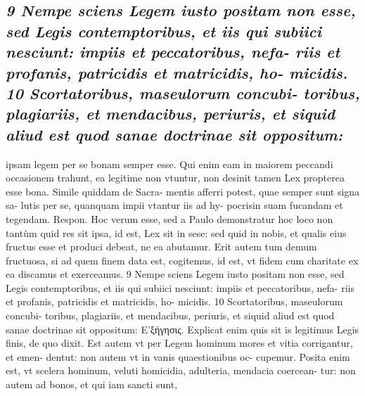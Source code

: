 \documentclass{article}
\begin{document}
\begin{pages}
\subsection*{\textit{9 Nempe sciens Legem iusto positam non esse, sed Legis contemptoribus, et iis qui subiici nesciunt: impiis et peccatoribus, nefa- riis et profanis, patricidis et matricidis, ho- micidis. 10 Scortatoribus, maseulorum concubi- toribus, plagiariis, et mendacibus, periuris, et siquid aliud est quod sanae doctrinae sit oppositum:}}ipsam legem per se bonam semper esse. Qui enim eam in maiorem peccandi occasionem trahunt, ea legitime non vtuntur, non desinit tamen Lex propterea esse bona. Simile quiddam de Sacra- mentis afferri potest, quae semper sunt signa sa- lutis per se, quanquam impii vtantur iis ad hy- pocrisin suam fucandam et tegendam. Respon. Hoc verum esse, sed a Paulo demonstratur hoc loco non tantùm quid res sit ipsa, id est, Lex sit in sese: sed quid in nobis, et qualis eius fructus esse et produci debeat, ne ea abutamur. Erit autem tum demum fructuosa, si ad quem finem data est, cogitemus, id est, vt fidem cum charitate ex ea discamus et exerceamus. 9 Nempe sciens Legem iusto positam non esse, sed Legis contemptoribus, et iis qui subiici nesciunt: impiis et peccatoribus, nefa- riis et profanis, patricidis et matricidis, ho- micidis. 10 Scortatoribus, maseulorum concubi- toribus, plagiariis, et mendacibus, periuris, et siquid aliud est quod sanae doctrinae sit oppositum: E’ξήγησις. Explicat enim quis sit is legitimus Legis finis, de quo dixit. Est autem vt per Legem hominum mores et vitia corrigantur, et emen- dentut: non autem vt in vanis quaestionibus oc- cupemur. Posita enim est, vt scelera hominum, veluti homicidia, adulteria, mendacia coercean- tur: non autem ad bonos, et qui iam sancti sunt,  \pend

\end{pages}
\end{document}
